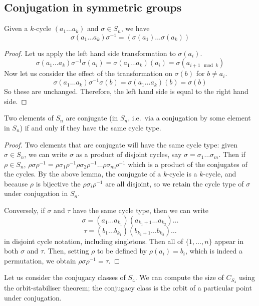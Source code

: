 \subsection{Conjugation in symmetric groups}
\begin{lemma}
	Given a \(k\)-cycle \((a_1\dots a_k)\) and \(\sigma \in S_n\), we have
	\[
		\sigma (a_1\dots a_k) \sigma^{-1} = (\sigma(a_1)\dots \sigma(a_k))
	\]
\end{lemma}
\begin{proof}
	Let us apply the left hand side transformation to \(\sigma(a_i)\).
	\[
		\sigma (a_1\dots a_k) \sigma^{-1} \sigma(a_i) = \sigma (a_1\dots a_k) (a_i) = \sigma(a_{i+1\mod k})
	\]
	Now let us consider the effect of the transformation on \(\sigma(b)\) for \(b \neq a_i\).
	\[
		\sigma (a_1\dots a_k) \sigma^{-1} \sigma(b) = \sigma (a_1\dots a_k) (b) = \sigma(b)
	\]
	So these are unchanged.
	Therefore, the left hand side is equal to the right hand side.
\end{proof}

\begin{proposition}
	Two elements of \(S_n\) are conjugate (in \(S_n\), i.e.\ via a conjugation by some element in \(S_n\)) if and only if they have the same cycle type.
\end{proposition}
\begin{proof}
	Two elements that are conjugate will have the same cycle type: given \(\sigma \in S_n\), we can write \(\sigma\) as a product of disjoint cycles, say \(\sigma = \sigma_1\dots\sigma_m\).
	Then if \(\rho \in S_n\), \(\rho \sigma \rho^{-1} = \rho \sigma_1 \rho^{-1} \rho \sigma_2 \rho^{-1} \dots \rho \sigma_m \rho^{-1}\) which is a product of the conjugates of the cycles.
	By the above lemma, the conjugate of a \(k\)-cycle is a \(k\)-cycle, and because \(\rho\) is bijective the \(\rho \sigma_i \rho^{-1}\) are all disjoint, so we retain the cycle type of \(\sigma\) under conjugation in \(S_n\).

	Conversely, if \(\sigma\) and \(\tau\) have the same cycle type, then we can write
	\[
		\sigma = (a_1\dots a_{k_1})(a_{k_1+1}\dots a_{k_2})\dots
	\]
	\[
		\tau = (b_1\dots b_{k_1})(b_{k_1+1}\dots b_{k_2})\dots
	\]
	in disjoint cycle notation, including singletons.
	Then all of \(\{ 1, \dots, n \}\) appear in both \(\sigma\) and \(\tau\).
	Then, setting \(\rho\) to be defined by \(\rho(a_i) = b_i\), which is indeed a permutation, we obtain \(\rho\sigma\rho^{-1}=\tau\).
\end{proof}
Let us consider the conjugacy classes of \(S_4\).
We can compute the size of \(C_{S_4}\) using the orbit-stabiliser theorem; the conjugacy class is the orbit of a particular point under conjugation.\medskip

